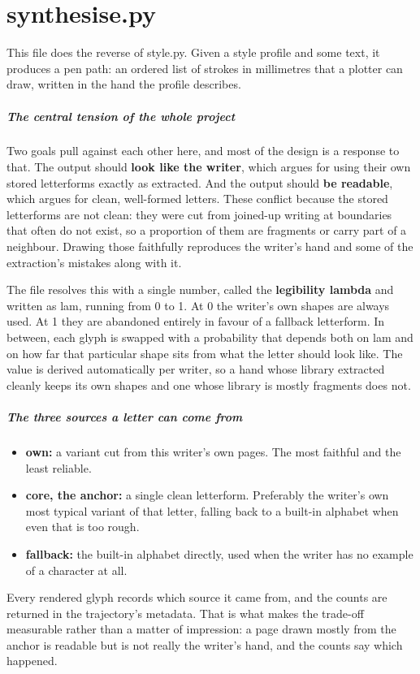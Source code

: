 
\chapter{synthesise.py}
This file does the reverse of style.py. Given a style profile and some text, it produces a pen path: an ordered list of strokes in millimetres that a plotter can draw, written in the hand the profile describes.


\paragraph{The central tension of the whole project}
Two goals pull against each other here, and most of the design is a response to that. The output should \textbf{look like the writer}, which argues for using their own stored letterforms exactly as extracted. And the output should \textbf{be readable}, which argues for clean, well-formed letters. These conflict because the stored letterforms are not clean: they were cut from joined-up writing at boundaries that often do not exist, so a proportion of them are fragments or carry part of a neighbour. Drawing those faithfully reproduces the writer's hand and some of the extraction's mistakes along with it.

The file resolves this with a single number, called the \textbf{legibility lambda} and written as lam, running from 0 to 1. At 0 the writer's own shapes are always used. At 1 they are abandoned entirely in favour of a fallback letterform. In between, each glyph is swapped with a probability that depends both on lam and on how far that particular shape sits from what the letter should look like. The value is derived automatically per writer, so a hand whose library extracted cleanly keeps its own shapes and one whose library is mostly fragments does not.


\paragraph{The three sources a letter can come from}

\begin{itemize}\setlength\itemsep{0pt}
  \item \textbf{own:} a variant cut from this writer's own pages. The most faithful and the least reliable.
  \item \textbf{core, the anchor:} a single clean letterform. Preferably the writer's own most typical variant of that letter, falling back to a built-in alphabet when even that is too rough.
  \item \textbf{fallback:} the built-in alphabet directly, used when the writer has no example of a character at all.
\end{itemize}
Every rendered glyph records which source it came from, and the counts are returned in the trajectory's metadata. That is what makes the trade-off measurable rather than a matter of impression: a page drawn mostly from the anchor is readable but is not really the writer's hand, and the counts say which happened.



